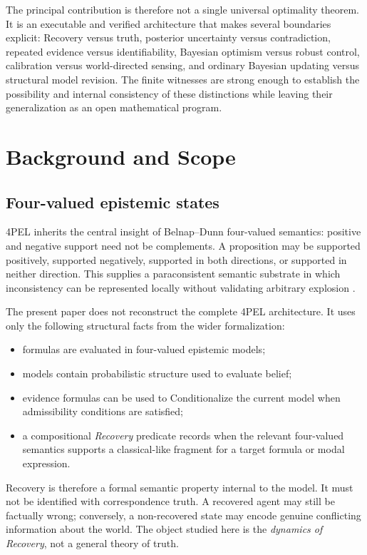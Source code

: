 The principal contribution is therefore not a single universal optimality theorem. It is an executable and verified architecture that makes several boundaries explicit: Recovery versus truth, posterior uncertainty versus contradiction, repeated evidence versus identifiability, Bayesian optimism versus robust control, calibration versus world-directed sensing, and ordinary Bayesian updating versus structural model revision. The finite witnesses are strong enough to establish the possibility and internal consistency of these distinctions while leaving their generalization as an open mathematical program.

\section{Background and Scope}

\subsection{Four-valued epistemic states}

4PEL inherits the central insight of Belnap--Dunn four-valued semantics: positive and negative support need not be complements. A proposition may be supported positively, supported negatively, supported in both directions, or supported in neither direction. This supplies a paraconsistent semantic substrate in which inconsistency can be represented locally without validating arbitrary explosion \cite{belnap1977useful,dunn1976}.

The present paper does not reconstruct the complete 4PEL architecture. It uses only the following structural facts from the wider formalization:

\begin{itemize}
  \item formulas are evaluated in four-valued epistemic models;
  \item models contain probabilistic structure used to evaluate belief;
  \item evidence formulas can be used to Conditionalize the current model when admissibility conditions are satisfied;
  \item a compositional \emph{Recovery} predicate records when the relevant four-valued semantics supports a classical-like fragment for a target formula or modal expression.
\end{itemize}

Recovery is therefore a formal semantic property internal to the model. It must not be identified with correspondence truth. A recovered agent may still be factually wrong; conversely, a non-recovered state may encode genuine conflicting information about the world. The object studied here is the \emph{dynamics of Recovery}, not a general theory of truth.


